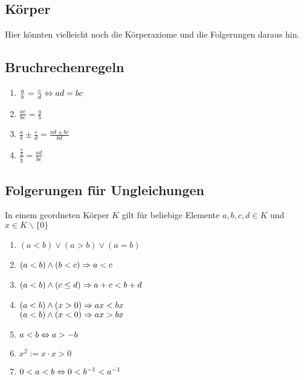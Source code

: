 \subsection*{Körper}
Hier könnten vielleicht noch die Körperaxiome und die Folgerungen daraus hin. 
\subsection*{Bruchrechenregeln}
\begin{enumerate}[label=\alph*., noitemsep]
    \item $\frac{a}{b} = \frac{c}{d} \Leftrightarrow ad = bc$
    \item $\frac{ae}{be} = \frac{a}{b}$
    \item $\frac{a}{b} \pm \frac{c}{d} = \frac{ad \pm bc}{bd}$
    \item $\frac{\frac{a}{b}}{\frac{e}{d}} = \frac{ad}{be}$
\end{enumerate}
\subsection*{Folgerungen für Ungleichungen}
In einem geordneten Körper $K$ gilt für beliebige Elemente $a, b, c, d \in K$ und $x \in K\backslash \{0\}$
\begin{enumerate}[label=\alph*., noitemsep]
    \item $(a < b) \lor (a > b) \lor (a = b)$
    \item $(a < b) \land (b < c) \Rightarrow a < c$
    \item $(a < b) \land (c \leq d) \Rightarrow a + c < b + d$
    \item $(a < b) \land (x > 0) \Rightarrow ax < bx$\\
          $(a < b) \land (x < 0) \Rightarrow ax > bx$
    \item $a < b \Leftrightarrow a > - b$
    \item $x^2 := x \cdot x > 0$
    \item $0 < a < b \Leftrightarrow 0 < b^{-1} < a^{-1}$
\end{enumerate}

